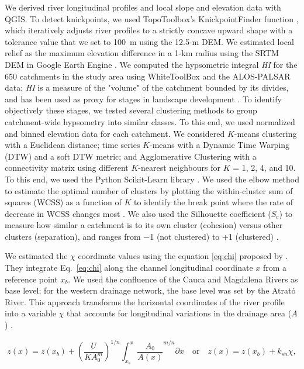 \documentclass[draft]{agujournal2019}
\begin{document}
\par We derived river longitudinal profiles and local slope and elevation data with QGIS. To detect knickpoints, we used TopoToolbox's KnickpointFinder function \cite{Schwanghart_2014}, which iteratively adjusts river profiles to a strictly concave upward shape with a tolerance value that we set to 100~m using the 12.5-m DEM. We estimated local relief as the maximum elevation difference in a 1-km radius using the SRTM DEM in Google Earth Engine \cite{moore2011}. We computed the hypsometric integral \textit{HI} for the 650 catchments in the study area using WhiteToolBox \cite{lindasy2014} and the ALOS-PALSAR data; \textit{HI} is a measure of the "volume" of the catchment bounded by its divides, and has been used as proxy for stages in landscape development \cite{Strahler1952, Gallen2011}. To identify objectively these stages, we tested several clustering methods to group catchment-wide hypsometry into similar classes. To this end, we used normalized and binned elevation data for each catchment. We considered $K$-means clustering with a Euclidean distance; time series $K$-means with a Dynamic Time Warping (DTW) and a soft DTW metric; and Agglomerative Clustering with a connectivity matrix using different $K$-nearest neighbours for $K$ = 1, 2, 4, and 10. To this end, we used the Python Scikit-Learn library \cite{scikit-learn2011}. We used the elbow method to estimate the optimal number of clusters by plotting the within-cluster sum of squares (WCSS) as a function of $K$ to identify the break point where the rate of decrease in WCSS changes most \cite{thorndike1953}. We also used the Silhouette coefficient ($S_c$) to measure how similar a catchment is to its own cluster (cohesion) versus other clusters (separation), and ranges from $-$1 (not clustered) to +1 (clustered) \cite{rousseeuw1987}. 

\par We estimated the $\chi$ coordinate values using the equation \ref{eq:chi} proposed by . They integrate Eq.~\ref{eq:chi} along the channel longitudinal coordinate $x$ from a reference point $x_b$. We used the confluence of the Cauca and Magdalena Rivers as base level; for the western drainage network, the base level was set by the Atrató River. This approach transforms the horizontal coordinates of the river profile into a variable $\chi$ that accounts for longitudinal variations in the drainage area ($A$) \cite{Mudd2014}.

\begin{linenomath*}
\label{eq:chi}
\begin{equation}
    z(x)= z(x_b)+\left(\frac{U}{KA_0^m}\right)^{1/n}\int_{x_b}^{x} \frac{A_0}{A(x)}^{m/n} \partial{x} \quad \text{or} \quad z(x)=z(x_b)+k_{sn}\chi,
\end{equation}
\end{linenomath*}
\end{document}
